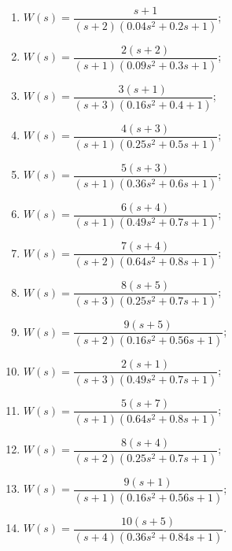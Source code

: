 \documentclass[a4paper,oneside,10pt]{book}
\theoremstyle{definition}
\begin{document}
\begin{multicols}{2}

	
	\begin{enumerate}
		\item
		
		$ 	W(s) = 
		\dfrac{s+1}
		{(s+2)(0.04s^2 + 0.2s+1)} $;
		\item 
		
		$ 	W(s) = 
		\dfrac{2(s+2)}
		{(s+1)(0.09s^2+0.3s+1)} $;
		
		\item 
		
		$ 		W(s) = 
		\dfrac{3(s+1)}
		{(s+3)(0.16s^2+0.4+1)} $;
		
		\item
		
		$ 	W(s) = 
		\dfrac{4(s+3)}
		{(s+1)(0.25s^2+0.5s+1)} $;
		
		\item 
		
		$ 	W(s) = 
		\dfrac{5(s+3)}
		{(s+1)(0.36s^2+0.6s+1)} $;
		
		\item
		
		$ 	W(s) = 
		\dfrac{6(s+4)}
		{(s+1)(0.49s^2+0.7s+1)} $;
		
		\item
		
		$ W(s) = 
		\dfrac{7(s+4)}
		{(s+2)(0.64s^2+0.8s+1)} $;
		
		\item
		
		$ W(s) = 
		\dfrac{8(s+5)}
		{(s+3)(0.25s^2+0.7s+1)} $;
		
		\item 
		
		$ W(s) = 
		\dfrac{9(s+5)}
		{(s+2)(0.16s^2+0.56s+1)} $;
		
	
		
		
		
		\item
		
		$ 	W(s) = 
		\dfrac{2(s+1)}
		{(s+3)(0.49s^2+0.7s+1)} $;
		
		\item
		
		$ W(s) = 
		\dfrac{5(s+7)}
		{(s+1)(0.64s^2+0.8s+1)} $;
		
		\item
		
		$ W(s) = 
		\dfrac{8(s+4)}
		{(s+2)(0.25s^2+0.7s+1)} $;
		
		\item 
		
		$ W(s) = 
		\dfrac{9(s+1)}
		{(s+1)(0.16s^2+0.56s+1)} $;
		
		
		
		
		\item 
		
		$ W(s) = 
		\dfrac{10(s+5)}
		{(s+4)(0.36s^2+0.84s+1)} $.
		
		
	\end{enumerate}
\end{multicols}
\end{document}
